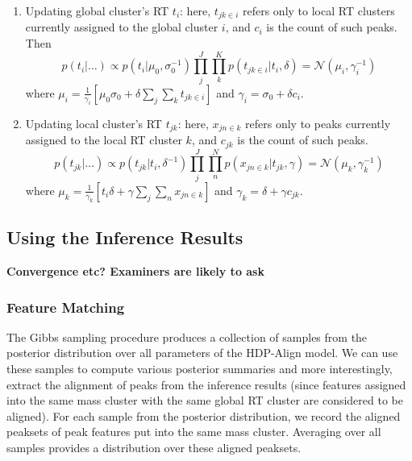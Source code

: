 \begin{enumerate}
\item Updating global cluster's RT $t_{i}$: here, $t_{jk\in i}$ refers only to local RT clusters currently assigned to the global cluster $i$, and $c_{i}$ is the count of such peaks. Then
\begin{dmath}
p(t_{i}|\ldots)\propto p(t_{i}|\mu_{0},\sigma_{0}^{-1})\prod_{j}^{J}\prod_{k}^{K}p(t_{jk\in i}|t_{i},\delta)=\mathcal{N}(\mu_{i},\gamma_{i}^{-1})
\end{dmath}
where $\mu_{i}=\frac{1}{\gamma_{i}}\left[\mu_{0}\sigma_{0}+\delta\sum_{j}\sum_{k}t_{jk\in i}\right]$ and $\gamma_{i}=\sigma_{0}+\delta c_{i}$. 
\item Updating local cluster's RT $t_{jk}$: here, $x_{jn\in k}$ refers only to peaks currently assigned to the local RT cluster $k$, and
$c_{jk}$ is the count of such peaks.
\begin{dmath}
p(t_{jk}|\ldots)\propto p(t_{jk}|t_{i},\delta^{-1})\prod_{j}^{J}\prod_{n}^{N}p(x_{jn\in k}|t_{jk},\gamma)=\mathcal{N}(\mu_{k},\gamma_{k}^{-1})
\end{dmath}
where $\mu_{k}=\frac{1}{\gamma_{k}}\left[t_{i}\delta+\gamma\sum_{j}\sum_{n}x_{jn\in k}\right]$ and $\gamma_{k}=\delta+\gamma c_{jk}$. 
\end{enumerate}

\subsection{Using the Inference Results}

\textbf{Convergence etc? Examiners are likely to ask}

\subsubsection{Feature Matching}
\label{subsub:feature-matching}

The Gibbs sampling procedure produces a collection of samples from the posterior distribution over all parameters of the HDP-Align model. We can use these samples to compute various posterior summaries and more interestingly, extract the alignment of peaks from the inference results (since features assigned into the same mass cluster with the same global RT cluster are considered to be aligned). For each sample from the posterior distribution, we record the aligned peaksets of peak features put into the same mass cluster. Averaging over all samples provides a distribution over these aligned peaksets. 

